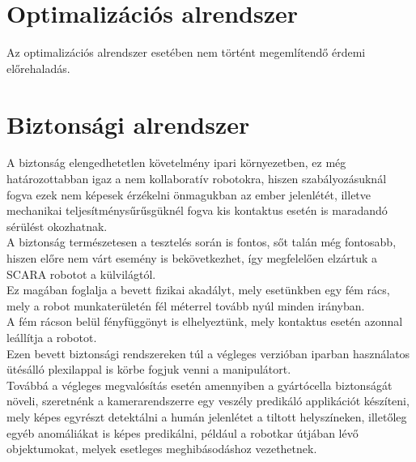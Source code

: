 \documentclass{article}
\begin{document}
\section{Optimalizációs alrendszer}
Az optimalizációs alrendszer esetében nem történt megemlítendő érdemi előrehaladás.

\section{Biztonsági alrendszer}
A biztonság elengedhetetlen követelmény ipari környezetben, ez még határozottabban igaz
a nem kollaboratív robotokra, hiszen szabályozásuknál fogva ezek nem képesek érzékelni önmagukban
az ember jelenlétét, illetve mechanikai teljesítménysűrűsgüknél fogva kis kontaktus
esetén is maradandó sérülést okozhatnak.\\
A biztonság természetesen a tesztelés során is fontos, sőt talán még fontosabb,
hiszen előre nem várt esemény is bekövetkezhet, így megfelelően elzártuk a SCARA robotot
a külvilágtól.\vspace{5pt}\\
Ez magában foglalja a bevett fizikai akadályt, mely esetünkben egy fém rács, mely a 
robot munkaterületén fél méterrel tovább nyúl minden irányban.\\
A fém rácson belül fényfüggönyt is elhelyeztünk, mely kontaktus esetén
azonnal leállítja a robotot.\vspace{5pt}\\
Ezen bevett biztonsági rendszereken túl a végleges verzióban iparban használatos ütésálló
plexilappal is körbe fogjuk venni a manipulátort.\\
Továbbá a végleges megvalósítás esetén amennyiben a gyártócella biztonságát növeli,
szeretnénk a kamerarendszerre egy veszély predikáló applikációt készíteni, mely
képes egyrészt detektálni a humán jelenlétet a tiltott helyszíneken, illetőleg
egyéb anomáliákat is képes predikálni, például a robotkar útjában lévő objektumokat,
melyek esetleges meghibásodáshoz vezethetnek.
\end{document}
